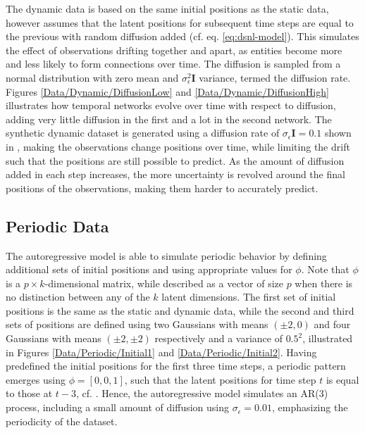         The dynamic data is based on the same initial positions as the static data, however assumes that the latent positions for subsequent time steps are equal to the previous with random diffusion added (cf. eq. \ref{eq:dsnl-model}). This simulates the effect of observations drifting together and apart, as entities become more and less likely to form connections over time. The diffusion is sampled from a normal distribution with zero mean and $\sigma_\epsilon^2\bm{I}$ variance, termed the diffusion rate. Figures \ref{Data/Dynamic/DiffusionLow} and \ref{Data/Dynamic/DiffusionHigh} illustrates how temporal networks evolve over time with respect to diffusion, adding very little diffusion in the first and a lot in the second network.
        The synthetic dynamic dataset is generated using a diffusion rate of $\sigma_\epsilon\bm{I}=0.1$ shown in , making the observations change positions over time, while limiting the drift such that the positions are still possible to predict. 
        As the amount of diffusion added in each step increases, the more uncertainty is revolved around the final positions of the observations, making them harder to accurately predict.
    
    \subsection{Periodic Data}
    
        The autoregressive model is able to simulate periodic behavior by defining additional sets of initial positions and using appropriate values for $\phi$. Note that $\phi$ is a $p\times k$-dimensional matrix, while described as a vector of size $p$ when there is no distinction between any of the $k$ latent dimensions.
        The first set of initial positions is the same as the static and dynamic data, while the second and third sets of positions are defined using two Gaussians with means $(\pm2,0)$ and four Gaussians with means $(\pm2,\pm2)$ respectively and a variance of $0.5^2$, illustrated in Figures \ref{Data/Periodic/Initial1} and \ref{Data/Periodic/Initial2}.
        Having predefined the initial positions for the first three time steps, a periodic pattern emerges using $\phi=[0, 0, 1]$, such that the latent positions for time step $t$ is equal to those at $t-3$, cf. .
        Hence, the autoregressive model simulates an AR(3) process, including a small amount of diffusion using $\sigma_\epsilon=0.01$, emphasizing the periodicity of the dataset.
        
